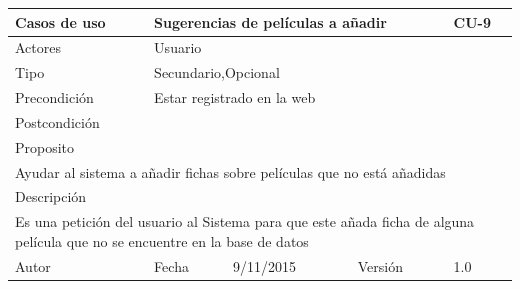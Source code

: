 \documentclass{article}
\begin{document}
\begin{table}[h]
\begin{tabular}{|l|l|l|l|l|l|}
\hline
\multicolumn{2}{|p{2cm}|}{Casos de uso}  & \multicolumn{3}{p{7cm}|}{Sugerencias de películas a añadir} & CU-9 \\
\hline
\multicolumn{2}{|p{2cm}|}{Actores}       & \multicolumn{4}{p{8cm}|}{Usuario}        \\
\hline
\multicolumn{2}{|p{2cm}|}{Tipo}          & \multicolumn{4}{p{8cm}|}{Secundario,Opcional}        \\
\hline
\multicolumn{2}{|p{2cm}|}{Precondición}  & \multicolumn{4}{p{8cm}|}{Estar registrado en la web}        \\
\hline
\multicolumn{2}{|p{2cm}|}{Postcondición} & \multicolumn{4}{p{8cm}|}{}        \\
\hline
\multicolumn{6}{|p{10cm}|}{Proposito}                                   \\
\hline
\multicolumn{6}{|p{10cm}|}{Ayudar al sistema a añadir fichas sobre películas que no está añadidas}                                            \\
\hline
\multicolumn{6}{|p{10cm}|}{Descripción}                                 \\
\hline
\multicolumn{6}{|p{10cm}|}{Es una petición del usuario al Sistema para que este añada ficha de alguna película que no se encuentre en la base de datos}                                            \\
\hline
Autor              &              & Fecha    &  9/11/2015   &   Versión  &1.0\\
\hline
\end{tabular}
\end{table}
\end{document}
